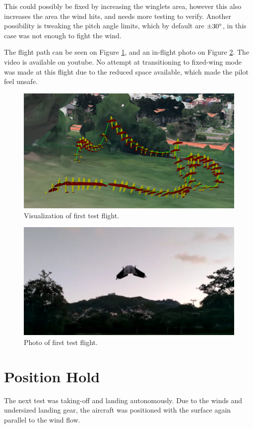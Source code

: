 This could possibly be fixed by increasing the winglets area, however this also increases the area the wind hits, and needs more testing to verify.
%
Another possibility is tweaking the pitch angle limits, which by default are $\pm 30\degree$, in this case was not enough to fight the wind.

The flight path can be seen on Figure \ref{fig:flight1-3d}, and an in-flight photo on Figure \ref{fig:flight1-photo}. The video is available on youtube\cite{flight1}.
%
No attempt at transitioning to fixed-wing mode was made at this flight due to the reduced space available, which made the pilot feel unsafe.
	

\begin{figure}[H]
\centering
  \includegraphics[width=0.7\linewidth]{figs/flight1-3d.png}
  \caption{Visualization of first test flight.}
  \label{fig:flight1-3d}
\end{figure}
	
	\begin{figure}[H]
\centering
  \includegraphics[width=0.7\linewidth]{figs/flight1-photo.png}
  \caption{Photo of first test flight.}
  \label{fig:flight1-photo}
\end{figure}
	



\section{Position Hold}
The next test was taking-off and landing autonomously. Due to the winds and undersized landing gear, the aircraft was positioned with the surface again parallel to the wind flow.

